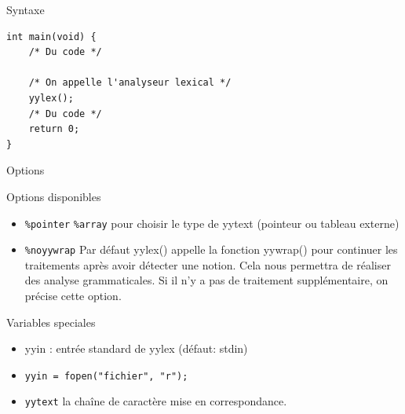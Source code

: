 \begin{frame}[containsverbatim]{\ftitle}
\def\blocktitle{Syntaxe}
\begin{block}{\blocktitle}
\begin{verbatim}int main(void) {
	/* Du code */
	
	/* On appelle l'analyseur lexical */
	yylex();
	/* Du code */
	return 0;
}

\end{verbatim}
\end{block}
\end{frame}

\def\ftitle{Options}
\begin{frame}[containsverbatim]{\ftitle}
\def\blocktitle{Options disponibles}
\begin{block}{\blocktitle}
\begin{itemize}
\item \verb!%pointer! \verb!%array! pour choisir le type de yytext (pointeur ou tableau externe)
\item \verb!%noyywrap! Par défaut yylex() appelle la fonction yywrap() pour continuer les traitements après avoir détecter une notion.
Cela nous permettra de réaliser des analyse grammaticales. Si il n'y a pas de traitement supplémentaire, on précise cette option.
\end{itemize}
\end{block}
\def\blocktitle{Variables speciales}
\begin{block}{\blocktitle}
\begin{itemize}
\item yyin : entrée standard de yylex (défaut: stdin)
\item \verb!yyin = fopen("fichier", "r");!
\item \verb!yytext! la chaîne de caractère mise en correspondance.
\end{itemize}
\end{block}
\end{frame}

